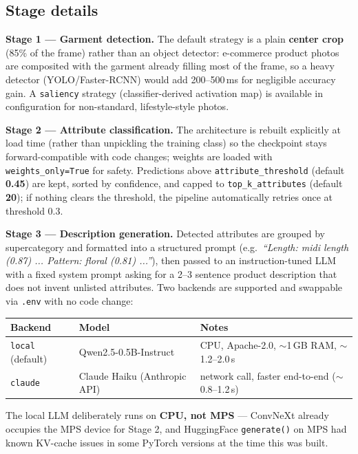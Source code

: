 \documentclass[11pt]{article}
\newcommand{\code}[1]{\texttt{\small #1}}
\begin{document}
\subsection{Stage details}

\textbf{Stage 1 --- Garment detection.} The default strategy is a plain \textbf{center crop} (85\% of the frame) rather than an object detector: e-commerce product photos are composited with the garment already filling most of the frame, so a heavy detector (YOLO/Faster-RCNN) would add 200--500\,ms for negligible accuracy gain. A \code{saliency} strategy (classifier-derived activation map) is available in configuration for non-standard, lifestyle-style photos.

\textbf{Stage 2 --- Attribute classification.} The architecture is rebuilt explicitly at load time (rather than unpickling the training class) so the checkpoint stays forward-compatible with code changes; weights are loaded with \code{weights\_only=True} for safety. Predictions above \code{attribute\_threshold} (default \textbf{0.45}) are kept, sorted by confidence, and capped to \code{top\_k\_attributes} (default \textbf{20}); if nothing clears the threshold, the pipeline automatically retries once at threshold 0.3.

\textbf{Stage 3 --- Description generation.} Detected attributes are grouped by supercategory and formatted into a structured prompt (e.g.\ \textit{``Length: midi length (0.87) ... Pattern: floral (0.81) ...''}), then passed to an instruction-tuned LLM with a fixed system prompt asking for a 2--3 sentence product description that does not invent unlisted attributes. Two backends are supported and swappable via \code{.env} with no code change:

\begin{center}
\begin{tabular}{lll}
\toprule
\textbf{Backend} & \textbf{Model} & \textbf{Notes} \\
\midrule
\code{local} (default) & Qwen2.5-0.5B-Instruct & CPU, Apache-2.0, $\sim$1\,GB RAM, $\sim$1.2--2.0\,s \\
\code{claude} & Claude Haiku (Anthropic API) & network call, faster end-to-end ($\sim$0.8--1.2\,s) \\
\bottomrule
\end{tabular}
\end{center}

The local LLM deliberately runs on \textbf{CPU, not MPS} --- ConvNeXt already occupies the MPS device for Stage 2, and HuggingFace \code{generate()} on MPS had known KV-cache issues in some PyTorch versions at the time this was built.
\end{document}
